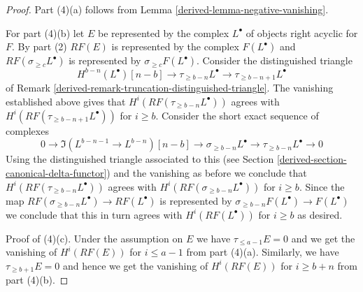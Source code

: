 \begin{proof}
\medskip\noindent
Part (4)(a) follows from Lemma \ref{derived-lemma-negative-vanishing}.

\medskip\noindent
For part (4)(b) let $E$ be represented by the complex $L^\bullet$
of objects right acyclic for $F$. By part (2) $RF(E)$ is represented
by the complex $F(L^\bullet)$ and $RF(\sigma_{\geq c}L^\bullet)$
is represented by $\sigma_{\geq c}F(L^\bullet)$. Consider the
distinguished triangle
$$
H^{b - n}(L^\bullet)[n - b] \to
\tau_{\geq b - n}L^\bullet \to
\tau_{\geq b - n + 1}L^\bullet
$$
of Remark \ref{derived-remark-truncation-distinguished-triangle}.
The vanishing established above gives that
$H^i(RF(\tau_{\geq b - n}L^\bullet))$ agrees with
$H^i(RF(\tau_{\geq b - n + 1}L^\bullet))$ for $i \geq b$.
Consider the short exact sequence of complexes
$$
0 \to
\Im(L^{b - n - 1} \to L^{b - n})[n - b] \to
\sigma_{\geq b - n}L^\bullet \to
\tau_{\geq b - n}L^\bullet \to 0
$$
Using the distinguished triangle associated to this
(see Section \ref{derived-section-canonical-delta-functor})
and the vanishing as before we conclude that
$H^i(RF(\tau_{\geq b - n}L^\bullet))$ agrees with
$H^i(RF(\sigma_{\geq b - n}L^\bullet))$ for $i \geq b$.
Since the map $RF(\sigma_{\geq b - n}L^\bullet) \to RF(L^\bullet)$
is represented by $\sigma_{\geq b - n}F(L^\bullet) \to F(L^\bullet)$
we conclude that this in turn agrees with $H^i(RF(L^\bullet))$
for $i \geq b$ as desired.

\medskip\noindent
Proof of (4)(c). Under the assumption on $E$ we have
$\tau_{\leq a - 1}E = 0$ and we get the vanishing
of $H^i(RF(E))$ for $i \leq a - 1$ from part (4)(a).
Similarly, we have $\tau_{\geq b + 1}E = 0$ and hence
we get the vanishing of $H^i(RF(E))$ for $i \geq b + n$ from
part (4)(b).
\end{proof}

